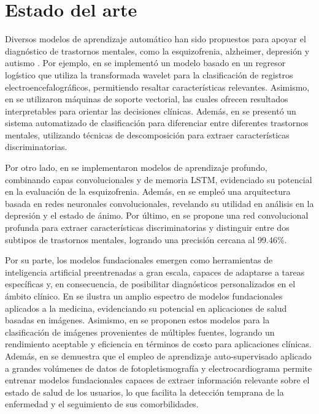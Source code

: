\section{Estado del arte}

Diversos modelos de aprendizaje automático han sido propuestos para apoyar el diagnóstico de trastornos mentales, como la esquizofrenia, alzheimer, depresión y autismo \cite{Arbabshirani2017137}. Por ejemplo, en \cite{10.1007/978-3-030-89691-1_41} se implementó un modelo basado en un regresor logístico que utiliza la transformada wavelet para la clasificación de registros electroencefalográficos, permitiendo resaltar características relevantes. Asimismo, en \cite{Vaidya202051} se utilizaron máquinas de soporte vectorial, las cuales ofrecen resultados interpretables para orientar las decisiones clínicas. Además, en \cite{Tor2021} se presentó un sistema automatizado de clasificación para diferenciar entre diferentes trastornos mentales, utilizando técnicas de descomposición para extraer características discriminatorias.


Por otro lado, en \cite{Paraschiv2024676} se implementaron modelos de aprendizaje profundo, combinando capas convolucionales y de memoria LSTM, evidenciado su potencial en la evaluación de la esquizofrenia. Además, en \cite{Arji2023} se empleó una arquitectura basada en redes neuronales convolucionales, revelando su utilidad en análisis en la depresión y el estado de ánimo. Por último, en \cite{AHMADI2021102227} se propone una red convolucional profunda para extraer características discriminatorias y distinguir entre dos subtipos de trastornos mentales, logrando una precisión cercana al 99.46\%.

Por su parte, los modelos fundacionales emergen como herramientas de inteligencia artificial preentrenadas a gran escala, capaces de adaptarse a tareas específicas y, en consecuencia, de posibilitar diagnósticos personalizados en el ámbito clínico. En \cite{Zhang2024} se ilustra un amplio espectro de modelos fundacionales aplicados a la medicina, evidenciando su potencial en aplicaciones de salud basadas en imágenes. Asimismo, en \cite{Wang2023} se proponen estos modelos para la clasificación de imágenes provenientes de múltiples fuentes, logrando un rendimiento aceptable y eficiencia en términos de costo para aplicaciones clínicas. Además, en \cite{Abbaspourazad2024} se demuestra que el empleo de aprendizaje auto-supervisado aplicado a grandes volúmenes de datos de fotopletismografía y electrocardiograma permite entrenar modelos fundacionales capaces de extraer información relevante sobre el estado de salud de los usuarios, lo que facilita la detección temprana de la enfermedad y el seguimiento de sus comorbilidades.

